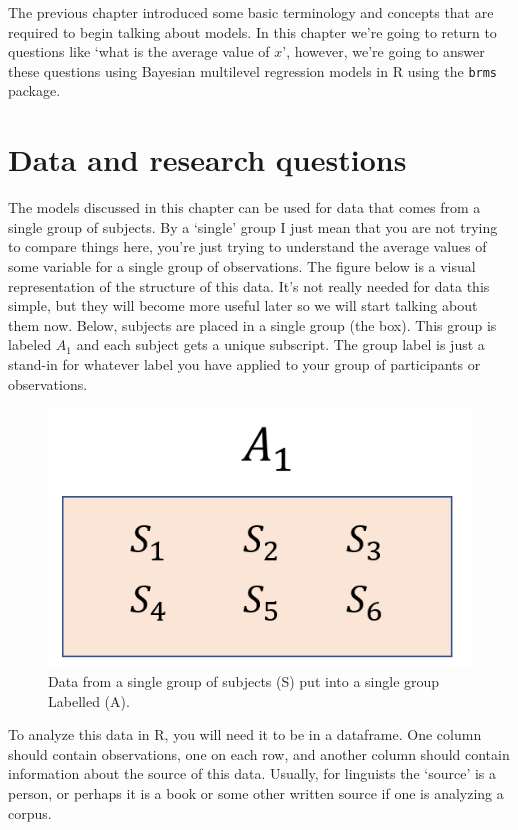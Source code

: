\documentclass[
]{book}
\begin{document}
The previous chapter introduced some basic terminology and concepts that are required to begin talking about models. In this chapter we're going to return to questions like `what is the average value of \(x\)', however, we're going to answer these questions using Bayesian multilevel regression models in R using the \texttt{brms} package.

\hypertarget{data-and-research-questions-1}{%
\section{Data and research questions}\label{data-and-research-questions-1}}

The models discussed in this chapter can be used for data that comes from a single group of subjects. By a `single' group I just mean that you are not trying to compare things here, you're just trying to understand the average values of some variable for a single group of observations. The figure below is a visual representation of the structure of this data. It's not really needed for data this simple, but they will become more useful later so we will start talking about them now. Below, subjects are placed in a single group (the box). This group is labeled \(A_1\) and each subject gets a unique subscript. The group label is just a stand-in for whatever label you have applied to your group of participants or observations.

\begin{figure}

{\centering \includegraphics[width=0.5\linewidth]{./images/design_ch2} 

}

\caption{Data from a single group of subjects (S) put into a single group Labelled (A).}\label{fig:F2-interactionfig}
\end{figure}

To analyze this data in R, you will need it to be in a dataframe. One column should contain observations, one on each row, and another column should contain information about the source of this data. Usually, for linguists the `source' is a person, or perhaps it is a book or some other written source if one is analyzing a corpus.
\end{document}
